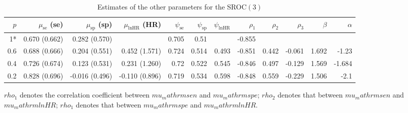 \begin{table}[!htb]

\caption{\label{tab:sroc-ki67-3}Estimates of the other parameters for the SROC$(3)$}
\centering
\begin{threeparttable}
\begin{tabular}[t]{rrrrrrrrrrrr}
\toprule
$p$ & $\mu_\mathrm{se}$ (se) & $\mu_\mathrm{sp}$ (sp) & $\mu_\mathrm{lnHR}$ (HR) & $\psi_\mathrm{se}$ & $\psi_\mathrm{sp}$ & $\psi_\mathrm{lnHR}$ & $\rho_1$ & $\rho_2$ & $\rho_3$ & $\beta$ & $\alpha$\\
\midrule
1* & 0.670 (0.662) & 0.282 (0.570) &  & 0.705 & 0.51 &  & -0.855 &  &  &  & \\
0.6 & 0.688 (0.666) & 0.204 (0.551) & 0.452 (1.571) & 0.724 & 0.514 & 0.493 & -0.851 & 0.442 & -0.061 & 1.692 & -1.23\\
0.4 & 0.726 (0.674) & 0.123 (0.531) & 0.231 (1.260) & 0.72 & 0.522 & 0.545 & -0.846 & 0.497 & -0.129 & 1.569 & -1.684\\
0.2 & 0.828 (0.696) & -0.016 (0.496) & -0.110 (0.896) & 0.719 & 0.534 & 0.598 & -0.848 & 0.559 & -0.229 & 1.506 & -2.1\\
\bottomrule
\end{tabular}
\begin{tablenotes}
\item 
			$rho_1$ denotes the correlation coefficient between $mu_mathrm{sen}$ and $mu_mathrm{spe}$;
			$rho_2$ denotes that between $mu_mathrm{sen}$ and $mu_mathrm{lnHR}$;
			$rho_1$ denotes that between $mu_mathrm{spe}$ and $mu_mathrm{lnHR}$.
\end{tablenotes}
\end{threeparttable}
\end{table}
